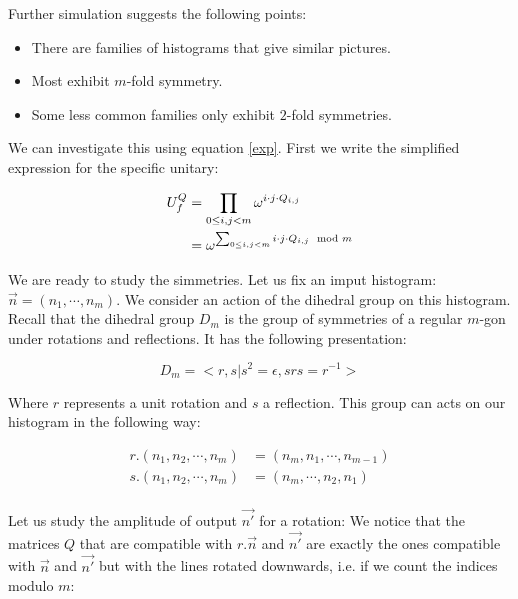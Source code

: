 Further simulation suggests the following points:

\begin{itemize}
  \item There are families of histograms that give similar pictures.
  \item Most exhibit $m$-fold symmetry.
  \item Some less common families only exhibit $2$-fold symmetries.
\end{itemize}

We can investigate this using equation \ref{exp}. First we write the simplified expression for the specific unitary:

\begin{align*}
  U_{f}^{Q} &= \prod_{0 \leq i,j < m} \omega^{i \cdot j \cdot Q_{i,j}} \\
  &= \omega^{\sum_{0 \leq  i,j < m} i \cdot j \cdot Q_{i,j} \mod m}
\end{align*}

We are ready to study the simmetries. Let us fix an imput histogram: $ \vec{n} = (n_1,\cdots,n_{m})$. We consider an action of the dihedral group on this histogram. Recall that the dihedral group $D_{m}$ is the group of symmetries of a regular $m$-gon under rotations and reflections. It has the following presentation:

\[D_{m} = <r, s | s^{2} = \epsilon, srs = r^{-1}>\]

Where $r$ represents a unit rotation and $s$ a reflection. This group can acts on our histogram in the following way:

\begin{align*}
  r.(n_1, n_2, \cdots, n_{m}) &= (n_{m}, n_{1}, \cdots, n_{m-1}) \\
  s.(n_1, n_2, \cdots, n_{m}) &= (n_{m}, \cdots, n_{2}, n_{1}) \\
\end{align*}

Let us study the amplitude of output $\vec{n'}$ for a rotation: We notice that the matrices $Q$ that are compatible with $r.\vec{n}$ and $\vec{n'}$ are exactly the ones compatible with $\vec{n}$ and $\vec{n'}$ but with the lines rotated downwards, i.e. if we count the indices modulo $m$:

